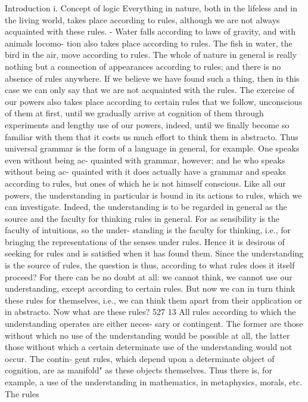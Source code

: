 Introduction
i.
Concept of logic
Everything in nature, both in the lifeless and in the living world, takes
place according to rules, although we are not always acquainted with these
rules. - Water falls according to laws of gravity, and with animals locomo-
tion also takes place according to rules. The fish in water, the bird in the
air, move according to rules. The whole of nature in general is really
nothing but a connection of appearances according to rules; and there is
no absence of rules anywhere. If we believe we have found such a thing, then
in this case we can only say that we are not acquainted with the rules.
The exercise of our powers also takes place according to certain rules
that we follow, unconscious of them at first, until we gradually arrive at
cognition of them through experiments and lengthy use of our powers,
indeed, until we finally become so familiar with them that it costs us much
effort to think them in abstracto. Thus universal grammar is the form of a
language in general, for example. One speaks even without being ac-
quainted with grammar, however; and he who speaks without being ac-
quainted with it does actually have a grammar and speaks according to
rules, but ones of which he is not himself conscious.
Like all our powers, the understanding in particular is bound in its
actions to rules, which we can investigate. Indeed, the understanding is
to be regarded in general as the source and the faculty for thinking rules
in general. For as sensibility is the faculty of intuitions, so the under-
standing is the faculty for thinking, i.e., for bringing the representations
of the senses under rules. Hence it is desirous of seeking for rules and is
satisfied when it has found them. Since the understanding is the source
of rules, the question is thus, according to what rules does it itself
proceed?
For there can be no doubt at all: we cannot think, we cannot use our
understanding, except according to certain rules. But now we can in turn
think these rules for themselves, i.e., we can think them apart from their
application or in abstracto. Now what are these rules?
527
13
All rules according to which the understanding operates are either neces-
sary or contingent. The former are those without which no use of the
understanding would be possible at all, the latter those without which a
certain determinate use of the understanding would not occur. The contin-
gent rules, which depend upon a determinate object of cognition, are as
manifold" as these objects themselves. Thus there is, for example, a use of
the understanding in mathematics, in metaphysics, morals, etc. The rules
